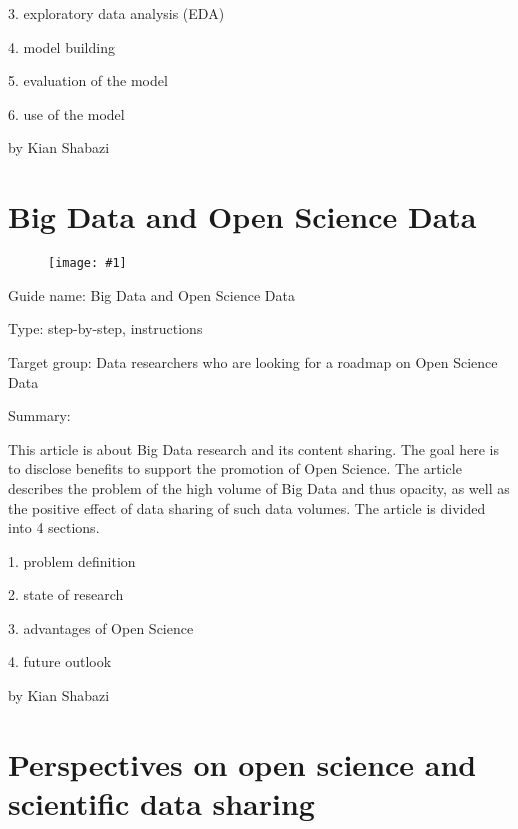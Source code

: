 \documentclass{article}
\newlength{\imgwidth}
\newcommand\scaledgraphics[2]{%
                
\settowidth{\imgwidth}{\texttt{[image: \#1]}}%
                
\setlength{\imgwidth}{\minof{\imgwidth}{#2\textwidth}}%
                
\texttt{[image: \#1]}%
                
}
\begin{document}
3. exploratory data analysis (EDA)


4. model building


5. evaluation of the model


6. use of the model





by Kian Shabazi





\section{Big Data and Open Science Data}\label{H6205473}



\begin{center}
\begin{figure}
\scaledgraphics{25f071a6-9aec-4c08-bfd3-bfb548adfaee.jpg}{0.5}
\label{F77040021}
\end{figure}


\end{center}


 


Guide name: Big Data and Open Science Data \autocite{gutierrez_big_2015}


Type: step-by-step, instructions


Target group: Data researchers who are looking for a roadmap on Open Science Data


Summary: 


This article is about Big Data research and its content sharing. The goal here is to disclose benefits to support the promotion of Open Science. The article describes the problem of the high volume of Big Data and thus opacity, as well as the positive effect of data sharing of such data volumes. The article is divided into 4 sections.


1. problem definition


2. state of research


3. advantages of Open Science


4. future outlook





by Kian Shabazi





\section{Perspectives on open science and scientific data sharing}\label{H5120034}
\end{document}
